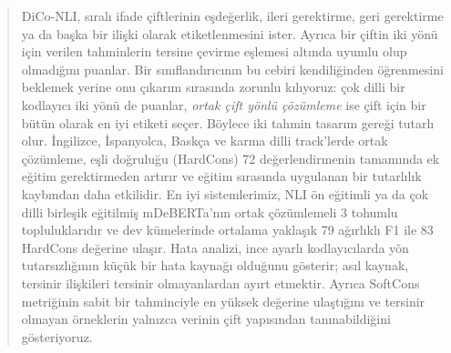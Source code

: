 \begin{abstract}
DiCo-NLI, sıralı ifade çiftlerinin eşdeğerlik, ileri gerektirme, geri gerektirme ya da başka bir ilişki olarak etiketlenmesini ister. Ayrıca bir çiftin iki yönü için verilen tahminlerin tersine çevirme eşlemesi altında uyumlu olup olmadığını puanlar. Bir sınıflandırıcının bu cebiri kendiliğinden öğrenmesini beklemek yerine onu çıkarım sırasında zorunlu kılıyoruz: çok dilli bir kodlayıcı iki yönü de puanlar, \emph{ortak çift yönlü çözümleme} ise çift için bir bütün olarak en iyi etiketi seçer. Böylece iki tahmin tasarım gereği tutarlı olur. İngilizce, İspanyolca, Baskça ve karma dilli track'lerde ortak çözümleme, eşli doğruluğu (HardCons) 72 değerlendirmenin tamamında ek eğitim gerektirmeden artırır ve eğitim sırasında uygulanan bir tutarlılık kaybından daha etkilidir. En iyi sistemlerimiz, NLI ön eğitimli ya da çok dilli birleşik eğitilmiş mDeBERTa'nın ortak çözümlemeli 3 tohumlu topluluklarıdır ve dev kümelerinde ortalama yaklaşık 79 ağırlıklı F1 ile 83 HardCons değerine ulaşır. Hata analizi, ince ayarlı kodlayıcılarda yön tutarsızlığının küçük bir hata kaynağı olduğunu gösterir; asıl kaynak, tersinir ilişkileri tersinir olmayanlardan ayırt etmektir. Ayrıca SoftCons metriğinin sabit bir tahminciyle en yüksek değerine ulaştığını ve tersinir olmayan örneklerin yalnızca verinin çift yapısından tanınabildiğini gösteriyoruz.
\end{abstract}
